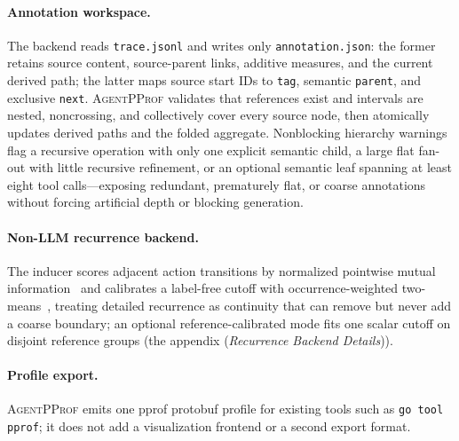\documentclass[letterpaper]{article}
\newcommand{\sys}{\textsc{AgentPProf}\xspace}
\begin{document}
\paragraph{Annotation workspace.}
The backend reads \texttt{trace.jsonl} and writes only \texttt{annotation.json}:
the former retains source content, source-parent links, additive measures, and
the current derived path; the latter maps source start IDs to \texttt{tag},
semantic \texttt{parent}, and exclusive \texttt{next}. \sys validates that
references exist and intervals are nested, noncrossing, and collectively cover
every source node, then atomically updates derived paths and the folded
aggregate.
Nonblocking hierarchy warnings flag a recursive operation with only one
explicit semantic child, a large flat fan-out with little recursive refinement,
or an optional semantic leaf spanning at least eight tool calls---exposing
redundant, prematurely flat, or coarse annotations without forcing artificial
depth or blocking generation.

\paragraph{Non-LLM recurrence backend.}
The inducer scores adjacent action transitions by normalized pointwise mutual
information~\cite{bouma2009npmi} and calibrates a label-free cutoff with
occurrence-weighted two-means~\cite{macqueen1967}, treating detailed recurrence
as continuity that can remove but never add a coarse boundary; an optional
reference-calibrated mode fits one scalar cutoff on disjoint reference groups
(the appendix (\emph{Recurrence Backend Details})).

\paragraph{Profile export.}
\sys emits one pprof protobuf profile for existing tools such as
\texttt{go tool pprof}; it does not add a visualization frontend or a second
export format.
\end{document}
